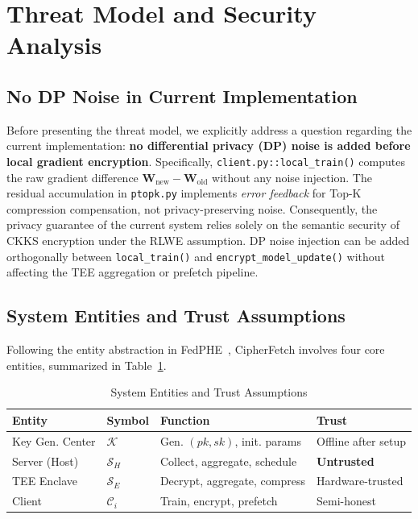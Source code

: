 \section{Threat Model and Security Analysis}
\label{sec:threat-model}

\subsection{No DP Noise in Current Implementation}

Before presenting the threat model, we explicitly address a question regarding the current implementation: \textbf{no differential privacy (DP) noise is added before local gradient encryption}. Specifically, \texttt{client.py::local\_train()} computes the raw gradient difference $\mathbf{W}_{\text{new}} - \mathbf{W}_{\text{old}}$ without any noise injection. The residual accumulation in \texttt{ptopk.py} implements \textit{error feedback} for Top-K compression compensation, not privacy-preserving noise. Consequently, the privacy guarantee of the current system relies solely on the semantic security of CKKS encryption under the RLWE assumption. DP noise injection can be added orthogonally between \texttt{local\_train()} and \texttt{encrypt\_model\_update()} without affecting the TEE aggregation or prefetch pipeline.

\subsection{System Entities and Trust Assumptions}

Following the entity abstraction in FedPHE~\cite{li2025fedphe}, CipherFetch involves four core entities, summarized in Table~\ref{tab:entities}.

\begin{table}[t]
\centering
\caption{System Entities and Trust Assumptions}
\label{tab:entities}
\begin{tabular}{@{}llll@{}}
\toprule
\textbf{Entity} & \textbf{Symbol} & \textbf{Function} & \textbf{Trust} \\
\midrule
Key Gen. Center & $\mathcal{K}$ & Gen. $(pk, sk)$, init. params & Offline after setup \\
Server (Host) & $\mathcal{S}_H$ & Collect, aggregate, schedule & \textbf{Untrusted} \\
TEE Enclave & $\mathcal{S}_E$ & Decrypt, aggregate, compress & Hardware-trusted \\
Client & $\mathcal{C}_i$ & Train, encrypt, prefetch & Semi-honest \\
\bottomrule
\end{tabular}
\end{table}


